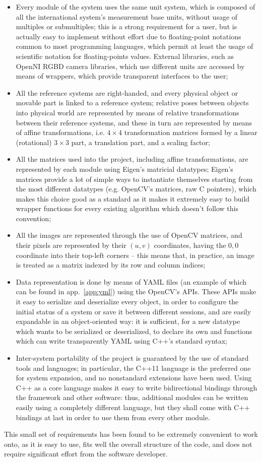 \begin{itemize}
\item{Every module of the system uses the same unit system, which is
  composed of all the international system's measurement base units,
  without usage of multiples or submultiples; this is a strong
  requirement for a user, but is actually easy to implement without
  effort due to floating-point notations common to most programming
  languages, which permit at least the usage of scientific notation
  for floating-points values. External libraries, such as OpenNI RGBD
  camera libraries, which use different units are accessed by means of
  wrappers, which provide transparent interfaces to the user;}
\item{All the reference systems are right-handed, and every physical
  object or movable part is linked to a reference system; relative poses
  between objects into physical world are represented by means of
  relative transformations between their reference systems, and these in turn are represented by means
  of affine transformations, i.e. $4 \times 4$ transformation matrices
  formed by a linear (rotational) $3 \times 3$ part, a translation
  part, and a scaling factor;}
\item{All the matrices used into the project, including affine transformations, are represented 
  by each module using Eigen's matricial datatypes; Eigen's matrices
  provide a lot of simple ways to instantiate themselves starting from
  the most different datatypes (e.g. OpenCV's matrices, raw C
  pointers), which makes this choice good as a standard as it makes it
  extremely easy to build wrapper functions for every existing
  algorithm which doesn't follow this convention;}
\item{All the images are represented through the use of OpenCV
  matrices, and their pixels are represented by their $(u,v)$
  coordinates, having the $0,0$ coordinate into their top-left corners
  -- this means that, in practice, an image is treated as a matrix
  indexed by its row and column indices;}
\item{Data representation is done by means of YAML files (an example
  of which can be found in app.~\ref{app:yml}) using the OpenCV's
  APIs. These APIs make it easy to serialize and deserialize every
  object, in order to configure the initial status of a system or save
  it between different sessions, and are easily expandable in an
  object-oriented way: it is sufficient, for a new datatype which
  wants to be serialized or deserialized, to declare its own
   and  functions which can write transparently
  YAML using C++'s standard  syntax;}
\item{Inter-system portability of the project is guaranteed by the use
  of standard tools and languages; in particular, the C++11 language is
  the preferred one for system expansion, and no nonstandard extensions
  have been used. Using C++ as a core language makes it easy to write
  bidirectional bindings through the framework and other software: thus,
  additional modules can be written easily using a completely different
  language, but they shall come with C++ bindings at last in order to
  use them from every other module.}
\end{itemize}

This small set of requirements has been found to be extremely
convenient to work onto, as it is easy to use, fits well the overall
structure of the code, and does not require significant effort from
the software developer.
